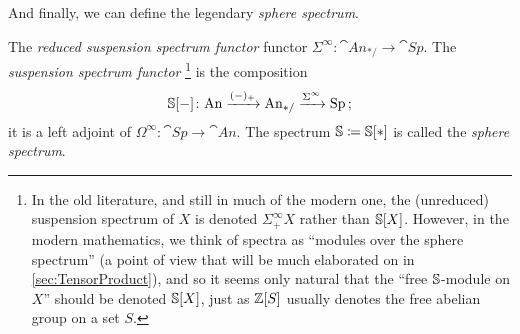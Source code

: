 And finally, we can define the legendary \emph{sphere spectrum}.
\begin{defi}\label{def:SphereSpectrum}
	The \emph{reduced suspension spectrum functor} functor $\Sigma^\infty\colon \cat{An}_{*/}\rightarrow\cat{Sp}$. The \emph{ suspension spectrum functor}
	\footnote{In the old literature, and still in much of the modern one, the (unreduced) suspension spectrum of $X$ is denoted $\Sigma^\infty_+X$ rather than $\mathbb{S}[X]$. However, in the modern mathematics, we think of spectra as \enquote{modules over the sphere spectrum} (a point of view that will be much elaborated on in \cref{sec:TensorProduct}), and so it seems only natural that the \enquote{free $\mathbb{S}$-module on $X$} should be denoted $\mathbb{S}[X]$, just as $\mathbb{Z}[S]$ usually denotes the free abelian group on a set $S$.}%
	is the composition
	\begin{equation*}
		\mathbb{S}[-]\colon \mathrm{An}\xrightarrow{(-)_+}\mathrm{An}_{*/}\xrightarrow{\Sigma^\infty} \mathrm{Sp}\,;
	\end{equation*}
	it is a left adjoint of $\Omega^\infty\colon \cat{Sp}\rightarrow \cat{An}$. The spectrum $\mathbb{S}\coloneqq \mathbb{S}[*]$ is called the \emph{sphere spectrum}.
\end{defi}
